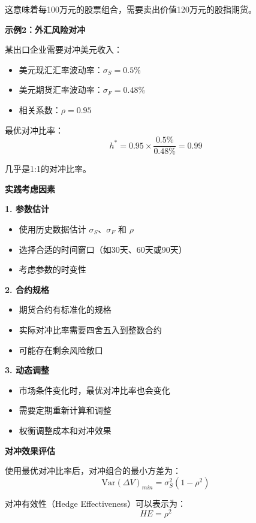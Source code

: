 这意味着每100万元的股票组合，需要卖出价值120万元的股指期货。

\textbf{示例2：外汇风险对冲}

某出口企业需要对冲美元收入：
\begin{itemize}
    \item 美元现汇汇率波动率：$\sigma_S = 0.5\%$
    \item 美元期货汇率波动率：$\sigma_F = 0.48\%$
    \item 相关系数：$\rho = 0.95$
\end{itemize}

最优对冲比率：
\begin{equation}
h^* = 0.95 \times \frac{0.5\%}{0.48\%} = 0.99
\end{equation}

几乎是1:1的对冲比率。

\textbf{实践考虑因素}

\textbf{1. 参数估计}
\begin{itemize}
    \item 使用历史数据估计 $\sigma_S$、$\sigma_F$ 和 $\rho$
    \item 选择合适的时间窗口（如30天、60天或90天）
    \item 考虑参数的时变性
\end{itemize}

\textbf{2. 合约规格}
\begin{itemize}
    \item 期货合约有标准化的规格
    \item 实际对冲比率需要四舍五入到整数合约
    \item 可能存在剩余风险敞口
\end{itemize}

\textbf{3. 动态调整}
\begin{itemize}
    \item 市场条件变化时，最优对冲比率也会变化
    \item 需要定期重新计算和调整
    \item 权衡调整成本和对冲效果
\end{itemize}

\textbf{对冲效果评估}

使用最优对冲比率后，对冲组合的最小方差为：
\begin{equation}
\text{Var}(\Delta V)_{min} = \sigma_S^2(1-\rho^2)
\end{equation}

对冲有效性（Hedge Effectiveness）可以表示为：
\begin{equation}
HE = \rho^2
\end{equation}

